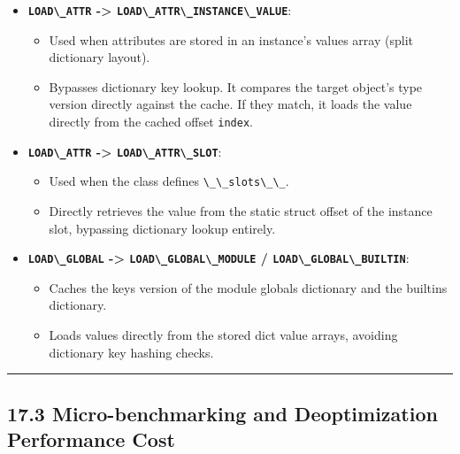 \begin{itemize}
\tightlist
\item
  \textbf{\passthrough{\lstinline!LOAD\_ATTR!} -\textgreater{}
  \passthrough{\lstinline!LOAD\_ATTR\_INSTANCE\_VALUE!}}:

  \begin{itemize}
  \tightlist
  \item
    Used when attributes are stored in an instance's values array (split
    dictionary layout).
  \item
    Bypasses dictionary key lookup. It compares the target object's type
    version directly against the cache. If they match, it loads the
    value directly from the cached offset
    \passthrough{\lstinline!index!}.
  \end{itemize}
\item
  \textbf{\passthrough{\lstinline!LOAD\_ATTR!} -\textgreater{}
  \passthrough{\lstinline!LOAD\_ATTR\_SLOT!}}:

  \begin{itemize}
  \tightlist
  \item
    Used when the class defines \passthrough{\lstinline!\_\_slots\_\_!}.
  \item
    Directly retrieves the value from the static struct offset of the
    instance slot, bypassing dictionary lookup entirely.
  \end{itemize}
\item
  \textbf{\passthrough{\lstinline!LOAD\_GLOBAL!} -\textgreater{}
  \passthrough{\lstinline!LOAD\_GLOBAL\_MODULE!} /
  \passthrough{\lstinline!LOAD\_GLOBAL\_BUILTIN!}}:

  \begin{itemize}
  \tightlist
  \item
    Caches the keys version of the module globals dictionary and the
    builtins dictionary.
  \item
    Loads values directly from the stored dict value arrays, avoiding
    dictionary key hashing checks.
  \end{itemize}
\end{itemize}

\begin{center}\rule{0.5\linewidth}{0.5pt}\end{center}

\hypertarget{micro-benchmarking-and-deoptimization-performance-cost}{%
\subsection{17.3 Micro-benchmarking and Deoptimization Performance
Cost}\label{micro-benchmarking-and-deoptimization-performance-cost}}

